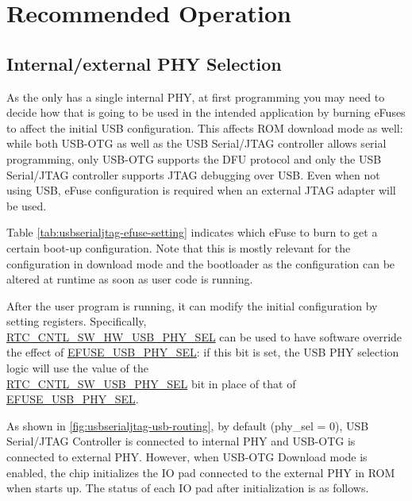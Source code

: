 \documentclass[main\_\_EN.tex]{subfiles}
\begin{document}
\section{Recommended Operation}
\label{sec:usbserialjtag-recommended-operation}

\subsection{Internal/external PHY Selection}

As the \chipname{} only has a single internal PHY, at first programming you may need to decide how that is going to be used in the intended application by burning eFuses to affect the initial USB configuration. This affects ROM download mode as well: while both USB-OTG as well as the USB Serial/JTAG controller allows serial programming, only USB-OTG supports the DFU protocol and only the USB Serial/JTAG controller supports JTAG debugging over USB. Even when not using USB, eFuse configuration is required when an external JTAG adapter will be used.

Table \ref{tab:usbserialjtag-efuse-setting} indicates which eFuse to burn to get a certain boot-up configuration. Note that this is mostly relevant for the configuration in download mode and the bootloader as the configuration can be altered at runtime as soon as user code is running.



After the user program is running, it can modify the initial configuration by setting registers. Specifically, \\\hyperref[fielddesc:RTCCNTLSWHWUSBPHYSEL]{RTC\_CNTL\_SW\_HW\_USB\_PHY\_SEL} can be used to have software override the effect of \hyperref[fielddesc:EFUSEUSBPHYSEL]{EFUSE\_USB\_PHY\_SEL}: if this bit is set, the USB PHY selection logic will use the value of the \\\hyperref[fielddesc:RTCCNTLSWUSBPHYSEL]{RTC\_CNTL\_SW\_USB\_PHY\_SEL} bit in place of that of \hyperref[fielddesc:EFUSEUSBPHYSEL]{EFUSE\_USB\_PHY\_SEL}.

As shown in \ref{fig:usbserialjtag-usb-routing}, by default (phy\_sel = 0), \chipseries{} USB Serial/JTAG Controller is connected to internal PHY and USB-OTG is connected to external PHY. However, when USB-OTG Download mode is enabled, the chip initializes the IO pad connected to the external PHY in ROM when starts up. The status of each IO pad after initialization is as follows.
\end{document}
